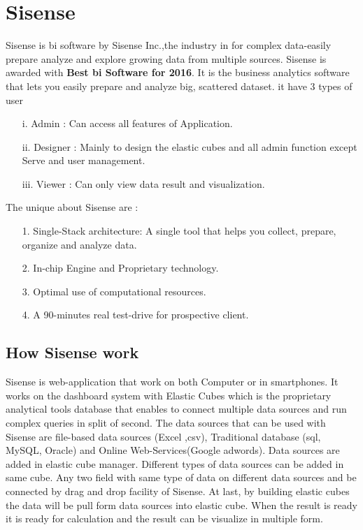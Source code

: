 \section{Sisense}
 \par
Sisense is \acl{bi} software by Sisense Inc.,the  industry in for complex data-easily prepare analyze and explore growing  data from multiple sources. Sisense is awarded with \textbf{Best \acl{bi} Software for    2016}. It is the business analytics software that lets you easily
prepare and analyze big, scattered dataset. it have 3 types of user 
\begin{enumerate}
\item[i.] Admin : Can access all features of Application.
\item[ii.] Designer : Mainly to design the elastic cubes and all admin function except Serve and user management.
\item[iii.] Viewer : Can only view data result and visualization.
\end{enumerate}
\par The  unique about Sisense are :

\begin{enumerate}
\item[1.] Single-Stack architecture: A single tool that helps you collect, prepare, organize and analyze data.
\item[2.] In-chip Engine and Proprietary technology.
\item[3.] Optimal use of computational resources.
\item[4.] A 90-minutes real test-drive for prospective client.
\end{enumerate}
\par
\subsection{How Sisense work}
Sisense is web-application that work on  both Computer or in smartphones. It works on the dashboard system with Elastic Cubes which is the proprietary analytical tools database that enables to connect multiple data sources and run complex queries in split of second. The data sources that can be used with Sisense are file-based data sources (Excel ,\acs{csv}), Traditional database (\acs{sql}, MySQL, Oracle) and Online Web-Services(Google adwords). Data sources are added in elastic cube manager.
 Different  types of data sources can be added in same cube. Any two field with same type of data on different data sources and be connected by drag and  drop facility of Sisense. At last, by building elastic cubes the data will be pull form data sources into elastic cube. When the result is ready it is ready for calculation and the result can be visualize in multiple form.
\newpage


